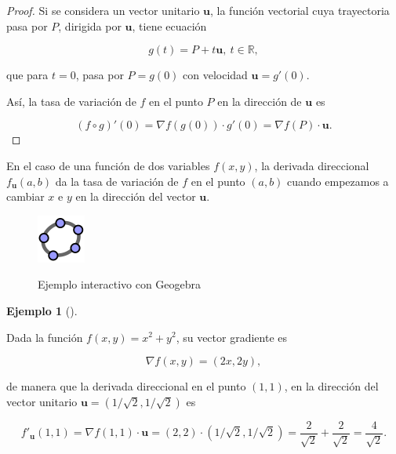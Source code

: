 \documentclass[
  a4paper,
]{scrreport}
\theoremstyle{plain}
\theoremstyle{plain}
\theoremstyle{definition}
\theoremstyle{definition}
\newtheorem{example}{Ejemplo}[chapter]
\theoremstyle{plain}
\theoremstyle{definition}
\theoremstyle{remark}
\begin{document}
\begin{tcolorbox}[enhanced jigsaw, rightrule=.15mm, toptitle=1mm, colbacktitle=quarto-callout-note-color!10!white, bottomrule=.15mm, opacityback=0, arc=.35mm, breakable, toprule=.15mm, left=2mm, coltitle=black, colback=white, opacitybacktitle=0.6, titlerule=0mm, colframe=quarto-callout-note-color-frame, bottomtitle=1mm, title=\textcolor{quarto-callout-note-color}{\faInfo}\hspace{0.5em}{Demostración}, leftrule=.75mm]

\begin{proof}

Si se considera un vector unitario \(\mathbf{u}\), la función vectorial
cuya trayectoria pasa por \(P\), dirigida por \(\mathbf{u}\), tiene
ecuación

\[
g(t)=P+t\mathbf{u},\ t\in\mathbb{R},
\]

que para \(t=0\), pasa por \(P=g(0)\) con velocidad
\(\mathbf{u}=g'(0)\).

Así, la tasa de variación de \(f\) en el punto \(P\) en la dirección de
\(\mathbf{u}\) es

\[
(f\circ g)'(0) = \nabla f(g(0))\cdot g'(0) = \nabla f(P)\cdot \mathbf{u}.
\]

\end{proof}

\end{tcolorbox}

En el caso de una función de dos variables \(f(x,y)\), la derivada
direccional \(f_{\mathbf{u}}(a,b)\) da la tasa de variación de \(f\) en
el punto \((a,b)\) cuando empezamos a cambiar \(x\) e \(y\) en la
dirección del vector \(\mathbf{u}\).

\begin{figure}

{\centering 

\href{https://www.geogebra.org/m/xyu2226b}{\includegraphics{img/logos/logo-geogebra.png}}

}

\caption{Ejemplo interactivo con Geogebra}

\end{figure}

\begin{example}[]\protect\hypertarget{exm-derivada-direccional}{}\label{exm-derivada-direccional}

Dada la función \(f(x,y) = x^2+y^2\), su vector gradiente es

\[
\nabla f(x,y) = (2x,2y),
\]

de manera que la derivada direccional en el punto \((1,1)\), en la
dirección del vector unitario \(\mathbf{u}=(1/\sqrt{2},1/\sqrt{2})\) es

\[
f'_{\mathbf{u}}(1,1) = \nabla f(1,1)\cdot \mathbf{u} = (2,2)\cdot(1/\sqrt{2},1/\sqrt{2}) = \frac{2}{\sqrt{2}}+\frac{2}{\sqrt{2}} = \frac{4}{\sqrt{2}}.
\]

\end{example}
\end{document}

